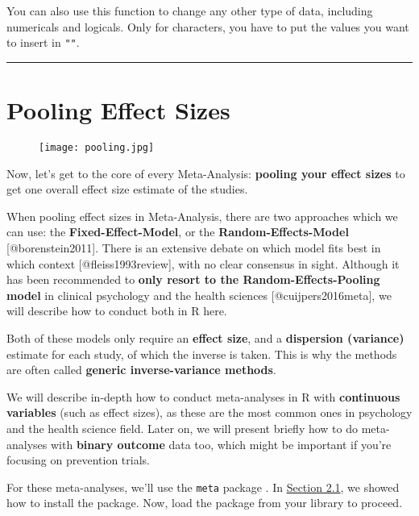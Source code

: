 \documentclass[]{book}
\theoremstyle{definition}
\theoremstyle{definition}
\theoremstyle{definition}
\theoremstyle{remark}
\begin{document}
You can also use this function to change any other type of data,
including numericals and logicals. Only for characters, you have to put
the values you want to insert in \texttt{""}.

\begin{center}\rule{0.5\linewidth}{\linethickness}\end{center}

\chapter{Pooling Effect Sizes}\label{pool}

\begin{figure}
\centering
\texttt{[image: pooling.jpg]}
\caption{}
\end{figure}

Now, let's get to the core of every Meta-Analysis: \textbf{pooling your
effect sizes} to get one overall effect size estimate of the studies.

\begin{rmdinfo}
When pooling effect sizes in Meta-Analysis, there are two approaches
which we can use: the \textbf{Fixed-Effect-Model}, or the
\textbf{Random-Effects-Model} {[}@borenstein2011{]}. There is an
extensive debate on which model fits best in which context
{[}@fleiss1993review{]}, with no clear consensus in sight. Although it
has been recommended to \textbf{only resort to the
Random-Effects-Pooling model} in clinical psychology and the health
sciences {[}@cuijpers2016meta{]}, we will describe how to conduct both
in R here.

Both of these models only require an \textbf{effect size}, and a
\textbf{dispersion (variance)} estimate for each study, of which the
inverse is taken. This is why the methods are often called
\textbf{generic inverse-variance methods}.
\end{rmdinfo}

We will describe in-depth how to conduct meta-analyses in R with
\textbf{continuous variables} (such as effect sizes), as these are the
most common ones in psychology and the health science field. Later on,
we will present briefly how to do meta-analyses with \textbf{binary
outcome} data too, which might be important if you're focusing on
prevention trials.

For these meta-analyses, we'll use the \texttt{meta} package
\citep{schwarzer2007meta}. In \protect\hyperlink{RStudio}{Section 2.1},
we showed how to install the package. Now, load the package from your
library to proceed.
\end{document}
